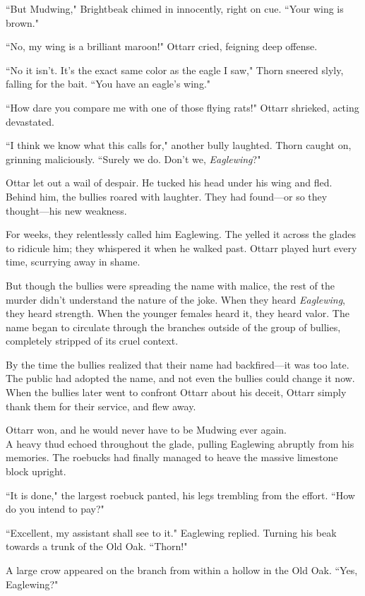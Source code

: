 ``But Mudwing," Brightbeak chimed in innocently, right on cue. ``Your wing is brown."

``No, my wing is a brilliant maroon!" Ottarr cried, feigning deep offense.

``No it isn't. It's the exact same color as the eagle I saw," Thorn sneered slyly, falling for the bait. ``You have an eagle's wing."

``How dare you compare me with one of those flying rats!" Ottarr shrieked, acting devastated.

``I think we know what this calls for," another bully laughted. Thorn caught on, grinning maliciously. ``Surely we do. Don't we, \textit{Eaglewing}?"

Ottar let out a wail of despair. He tucked his head under his wing and fled. Behind him, the bullies roared with laughter. They had found---or so they thought---his new weakness.

For weeks, they relentlessly called him Eaglewing. The yelled it across the glades to ridicule him; they whispered it when he walked past. Ottarr played hurt every time, scurrying away in shame.

But though the bullies were spreading the name with malice, the rest of the murder didn't understand the nature of the joke. When they heard \textit{Eaglewing}, they heard strength. When the younger females heard it, they heard valor. The name began to circulate through the branches outside of the group of bullies, completely stripped of its cruel context.

By the time the bullies realized that their name had backfired---it was too late. The public had adopted the name, and not even the bullies could change it now. When the bullies later went to confront Ottarr about his deceit, Ottarr simply thank them for their service, and flew away.

Ottarr won, and he would never have to be Mudwing ever again.\\

A heavy thud echoed throughout the glade, pulling Eaglewing abruptly from his memories. The roebucks had finally managed to heave the massive limestone block upright.

``It is done," the largest roebuck panted, his legs trembling from the effort. ``How do you intend to pay?"

``Excellent, my assistant shall see to it." Eaglewing replied. Turning his beak towards a trunk of the Old Oak. ``Thorn!"

A large crow appeared on the branch from within a hollow in the Old Oak. ``Yes, Eaglewing?"

